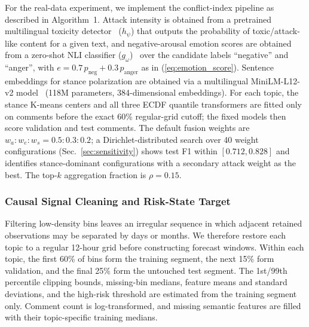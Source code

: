 \documentclass[journal]{IEEEtran}
\begin{document}
For the real-data experiment, we implement the conflict-index pipeline as described in Algorithm~1. Attack intensity is obtained from a pretrained multilingual toxicity detector~\cite{hanu2020multilingualtoxicity} ($h_\psi$) that outputs the probability of toxic/attack-like content for a given text, and negative-arousal emotion scores are obtained from a zero-shot NLI classifier ($g_\omega$)~\cite{xnliModel} over the candidate labels ``negative'' and ``anger'', with $e = 0.7\,p_{\text{neg}} + 0.3\,p_{\text{anger}}$ as in (\ref{eq:emotion_score}). Sentence embeddings for stance polarization are obtained via a multilingual MiniLM-L12-v2 model~\cite{wang2020minilm} (118M parameters, 384-dimensional embeddings). For each topic, the stance K-means centers and all three ECDF quantile transformers are fitted only on comments before the exact 60\% regular-grid cutoff; the fixed models then score validation and test comments. The default fusion weights are $w_a:w_e:w_s = 0.5:0.3:0.2$; a Dirichlet-distributed search over 40 weight configurations (Sec.~\ref{sec:sensitivity}) shows test F1 within $[0.712,0.828]$ and identifies stance-dominant configurations with a secondary attack weight as the best. The top-$k$ aggregation fraction is $\rho=0.15$.

\subsubsection{Causal Signal Cleaning and Risk-State Target}

Filtering low-density bins leaves an irregular sequence in which adjacent retained observations may be separated by days or months. We therefore restore each topic to a regular 12-hour grid before constructing forecast windows. Within each topic, the first 60\% of bins form the training segment, the next 15\% form validation, and the final 25\% form the untouched test segment. The 1st/99th percentile clipping bounds, missing-bin medians, feature means and standard deviations, and the high-risk threshold are estimated from the training segment only. Comment count is log-transformed, and missing semantic features are filled with their topic-specific training medians.
\end{document}
